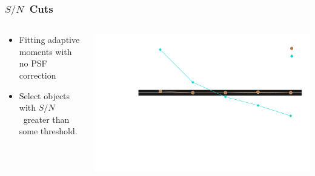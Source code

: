 \documentclass{beamer}
\newcommand{\snr}{$S/N$}
\begin{document}
\frame
{
    \frametitle{\snr\ Cuts}
 
 
    \begin{columns}
        \begin{column}{0.4\textwidth}
            \begin{itemize}
                \item Fitting {\color{lightsteelblue} adaptive moments} with 
                    {\color{red} no PSF correction}
                \item Select objects with \snr\ greater than some threshold.
            \end{itemize}
        \end{column}
        \begin{column}{0.6\textwidth}
            \begin{center}
            \includegraphics[width=\textwidth]{mc-select-bias-thresh-with-nocorr-inv.pdf}
                \newline
            \end{center}
        \end{column}
    \end{columns}


}
\end{document}
